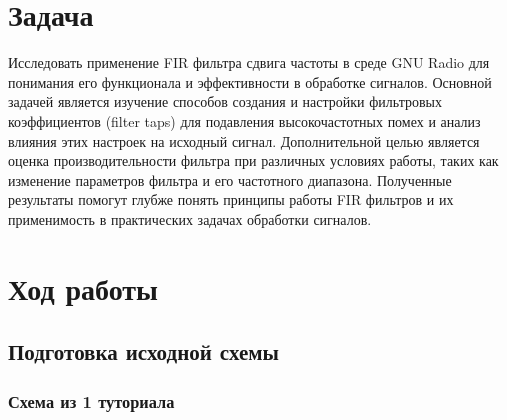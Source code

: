 \documentclass[a4paper,12pt]{extarticle}
\begin{document}
\begingroup
\setlength{\parindent}{0cm} %

\endgroup

\setlength{\parindent}{1.15cm} %



\section{Задача}\label{sec:s1}

\hspace{1.15cm}Исследовать применение FIR фильтра сдвига частоты в среде GNU Radio для 
понимания его функционала и эффективности в обработке сигналов. Основной 
задачей является изучение способов создания и настройки фильтровых коэффициентов 
(filter taps) для подавления высокочастотных помех и анализ влияния этих настроек 
на исходный сигнал. Дополнительной целью является оценка производительности фильтра 
при различных условиях работы, таких как изменение параметров фильтра и его частотного 
диапазона. Полученные результаты помогут глубже понять принципы работы FIR фильтров и 
их применимость в практических задачах обработки сигналов.

\section{Ход работы}

\subsection{Подготовка исходной схемы}\label{subsec:s2.1}

\subsubsection{Схема из 1 туториала}\label{subsec:s2.1.1}
\end{document}
